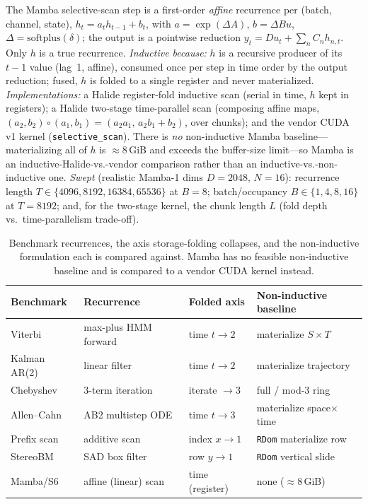 The Mamba selective-scan step is a first-order \emph{affine} recurrence per
(batch, channel, state), $h_t = a_t h_{t-1} + b_t$, with $a=\exp(\Delta A)$,
$b=\Delta B u$, $\Delta=\mathrm{softplus}(\delta)$; the output is a pointwise
reduction $y_t = D u_t + \sum_n C_n h_{n,t}$. Only $h$ is a true recurrence.
\emph{Inductive because:} $h$ is a recursive producer of its $t{-}1$ value (lag~1,
affine), consumed once per step in time order by the output reduction; fused, $h$
is folded to a single register and never materialized.
\emph{Implementations:} a Halide register-fold inductive scan (serial in time,
$h$ kept in registers); a Halide two-stage time-parallel scan (composing affine
maps, $(a_2,b_2)\circ(a_1,b_1)=(a_2 a_1,\,a_2 b_1{+}b_2)$, over chunks); and the
vendor CUDA v1 kernel (\texttt{selective\_scan}). There is \emph{no} non-inductive
Mamba baseline---materializing all of $h$ is ${\approx}8$\,GiB and exceeds the
buffer-size limit---so Mamba is an inductive-Halide-vs.-vendor comparison rather
than an inductive-vs.-non-inductive one.
\emph{Swept} (realistic Mamba-1 dims $D{=}2048,\,N{=}16$): recurrence length
$T\in\{4096,8192,16384,65536\}$ at $B{=}8$; batch/occupancy $B\in\{1,4,8,16\}$ at
$T{=}8192$; and, for the two-stage kernel, the chunk length $L$ (fold depth vs.\
time-parallelism trade-off).

\begin{table}[t]
  \centering
  \small
  \begin{tabular}{@{}llll@{}}
    \toprule
    Benchmark & Recurrence & Folded axis & Non-inductive baseline \\
    \midrule
    Viterbi     & max-plus HMM forward   & time $t\!\to\!2$      & materialize $S\times T$ \\
    Kalman AR(2)& linear filter          & time $t\!\to\!2$      & materialize trajectory \\
    Chebyshev   & 3-term iteration       & iterate $\to 3$       & full / mod-3 ring \\
    Allen--Cahn & AB2 multistep ODE      & time $t\!\to\!3$      & materialize space$\times$time \\
    Prefix scan & additive scan          & index $x\!\to\!1$     & \texttt{RDom} materialize row \\
    StereoBM    & SAD box filter         & row $y\!\to\!1$       & \texttt{RDom} vertical slide \\
    \midrule
    Mamba/S6    & affine (linear) scan   & time (register)      & none (${\approx}8$\,GiB) \\
    \bottomrule
  \end{tabular}
  \caption{Benchmark recurrences, the axis storage-folding collapses, and the
    non-inductive formulation each is compared against. Mamba has no feasible
    non-inductive baseline and is compared to a vendor CUDA kernel instead.}
  \label{tab:benchmarks}
\end{table}
